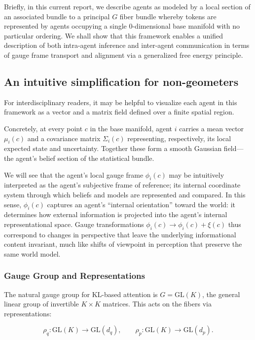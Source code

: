 \documentclass[twoside,11pt]{article}
\begin{document}
Briefly, in this current report, we describe agents as modeled by a local section of an associated bundle to a principal $G$ fiber bundle whereby tokens are represented by agents occupying a single 0-dimensional base manifold with no particular ordering. We shall show that this framework enables a unified description of both intra-agent inference and inter-agent communication in terms of gauge frame transport and alignment via a generalized free energy principle. 

\subsection{An intuitive simplification for non-geometers}
For interdisciplinary readers, it may be helpful to visualize each agent in this framework as a vector and a matrix field defined over a finite spatial region. 

Concretely, at every point $c$ in the base manifold, agent $i$ carries a mean vector $\mu_i(c)$ and a covariance matrix $\Sigma_i(c)$ representing, respectively, its local expected state and uncertainty. Together these form a smooth Gaussian field—the agent’s belief section of the statistical bundle. 

We will see that the agent's local gauge frame $\phi_i(c)$ may be intuitively interpreted as the agent's subjective frame of reference; its internal coordinate system through which beliefs and models are represented and compared. In this sense, $\phi_i(c)$ captures an agent’s “internal orientation” toward the world: it determines how external information is projected into the agent’s internal representational space. Gauge transformations $\phi_i(c) \to \phi_i(c) + \xi(c)$ thus correspond to changes in perspective that leave the underlying informational content invariant, much like shifts of viewpoint in perception that preserve the same world model. 



\subsubsection{Gauge Group and Representations}
The natural gauge group for KL-based attention is $G = \mathrm{GL}(K)$, the general linear group of invertible $K \times K$ matrices. This acts on the fibers via representations:

\begin{equation}
\rho_q: \mathrm{GL}(K) \to \mathrm{GL}(d_q),
\qquad
\rho_p: \mathrm{GL}(K) \to \mathrm{GL}(d_p).
\label{eq:representations}
\end{equation}
\end{document}
